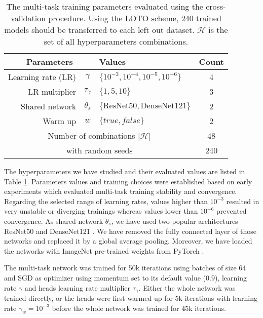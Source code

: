 \begin{table}
    \centering
    \caption{The multi-task training parameters evaluated using the cross-validation procedure. Using the LOTO scheme, 240 trained models should be transferred to each left out dataset. $\mathcal{H}$ is the set of all hyperparameters combinations.}
    \label{tab:mtask:results:parameters}
    \begin{tabular}{|rc|l|c|}
        \hline
        \multicolumn{2}{|c|}{Parameters} & Values & Count \\
        \hline
        Learning rate (LR) & $\gamma$ & $\{10^{-3}, 10^{-4}, 10^{-5}, 10^{-6}\}$ & 4 \\
        LR multiplier & $\tau_\gamma$ & $\{1, 5, 10\}$ & 3 \\
        Shared network & $\theta_s$ & $\{\text{ResNet50}, \text{DenseNet121}\}$ & 2 \\
        Warm up & $w$ & $\{true, false\}$ & 2 \\
        \hline
        \multicolumn{3}{|c|}{Number of combinations $\left|\mathcal{H}\right|$} & 48 \\
        \hline
        \multicolumn{3}{|c|}{with random seeds} & 240 \\
        \hline
    \end{tabular}
\end{table}

The hyperparameters we have studied and their evaluated values are listed in Table \ref{tab:mtask:results:parameters}. Parameters values and training choices were established based on early experiments which evaluated multi-task training stability and convergence. Regarding the selected range of learning rates, values higher than $10^{-3}$ resulted in very unstable or diverging trainings whereas values lower than $10^{-6}$ prevented convergence. As shared network $\theta_s$, we have used two popular architectures ResNet50 \cite{he2016deep} and DenseNet121 \cite{huang2017densely}. We have removed the fully connected layer of those networks and replaced it by a global average pooling. Moreover, we have loaded the networks with ImageNet pre-trained weights from PyTorch \cite{paszke2019pytorch}.

The multi-task network was trained for 50k iterations using batches of size 64 and SGD as optimizer using momentum set to its default value (\ie $0.9$), learning rate $\gamma$ and heads learning rate multiplier $\tau_\gamma$. Either the whole network was trained directly, or the heads were first warmed up for 5k iterations with learning rate $\gamma_w = 10^{-3}$ before the whole network was trained for 45k iterations.

